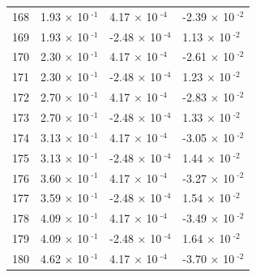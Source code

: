 \documentclass[a4paper,11pt]{article}
\begin{document}
\begin{center}
\begin{longtable}{|R{1.5cm}|R{2.5cm}|R{2.5cm}|R{2.5cm}|}
  168 &         1.93 $\times$ 10$^{\text{          -1}}$  &         4.17 $\times$ 10$^{\text{          -4}}$  &        -2.39 $\times$ 10$^{\text{          -2}}$ \\ 
  169 &         1.93 $\times$ 10$^{\text{          -1}}$  &        -2.48 $\times$ 10$^{\text{          -4}}$  &         1.13 $\times$ 10$^{\text{          -2}}$ \\ 
  170 &         2.30 $\times$ 10$^{\text{          -1}}$  &         4.17 $\times$ 10$^{\text{          -4}}$  &        -2.61 $\times$ 10$^{\text{          -2}}$ \\ 
  171 &         2.30 $\times$ 10$^{\text{          -1}}$  &        -2.48 $\times$ 10$^{\text{          -4}}$  &         1.23 $\times$ 10$^{\text{          -2}}$ \\ 
  172 &         2.70 $\times$ 10$^{\text{          -1}}$  &         4.17 $\times$ 10$^{\text{          -4}}$  &        -2.83 $\times$ 10$^{\text{          -2}}$ \\ 
  173 &         2.70 $\times$ 10$^{\text{          -1}}$  &        -2.48 $\times$ 10$^{\text{          -4}}$  &         1.33 $\times$ 10$^{\text{          -2}}$ \\ 
  174 &         3.13 $\times$ 10$^{\text{          -1}}$  &         4.17 $\times$ 10$^{\text{          -4}}$  &        -3.05 $\times$ 10$^{\text{          -2}}$ \\ 
  175 &         3.13 $\times$ 10$^{\text{          -1}}$  &        -2.48 $\times$ 10$^{\text{          -4}}$  &         1.44 $\times$ 10$^{\text{          -2}}$ \\ 
  176 &         3.60 $\times$ 10$^{\text{          -1}}$  &         4.17 $\times$ 10$^{\text{          -4}}$  &        -3.27 $\times$ 10$^{\text{          -2}}$ \\ 
  177 &         3.59 $\times$ 10$^{\text{          -1}}$  &        -2.48 $\times$ 10$^{\text{          -4}}$  &         1.54 $\times$ 10$^{\text{          -2}}$ \\ 
  178 &         4.09 $\times$ 10$^{\text{          -1}}$  &         4.17 $\times$ 10$^{\text{          -4}}$  &        -3.49 $\times$ 10$^{\text{          -2}}$ \\ 
  179 &         4.09 $\times$ 10$^{\text{          -1}}$  &        -2.48 $\times$ 10$^{\text{          -4}}$  &         1.64 $\times$ 10$^{\text{          -2}}$ \\ 
  180 &         4.62 $\times$ 10$^{\text{          -1}}$  &         4.17 $\times$ 10$^{\text{          -4}}$  &        -3.70 $\times$ 10$^{\text{          -2}}$ \\ 

\end{longtable}
\end{center}
\end{document}
